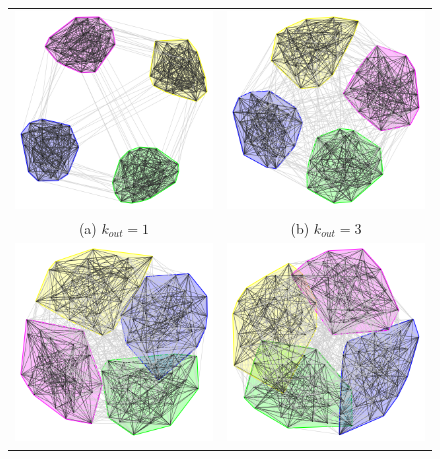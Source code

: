 \begin{figure}
	\begin{tabular}{cc}
		\includegraphics[width=65mm]{images/girvan_kout_1_0.png} &   \includegraphics[width=65mm]{images/girvan_kout_3_0.png} \\
		(a) $k_{out}=1$ & (b) $k_{out}=3$ \\[6pt]
		\includegraphics[width=65mm]{images/girvan_kout_5_0.png} &   \includegraphics[width=65mm]{images/girvan_kout_6_0.png} \\

\end{tabular}
\end{figure}
